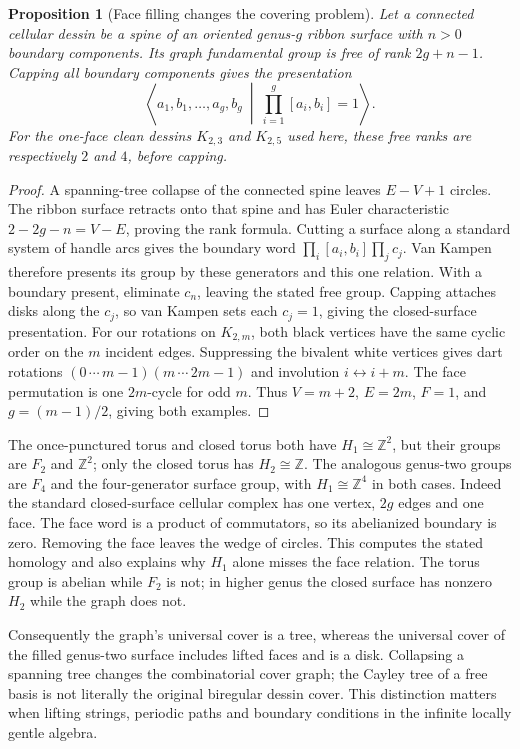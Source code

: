 \documentclass[11pt]{article}
\newtheorem{proposition}[theorem]{Proposition}
\theoremstyle{definition}\newtheorem{definition}[theorem]{Definition}
\theoremstyle{remark}\newtheorem{remark}[theorem]{Remark}
\begin{document}
\begin{proposition}[Face filling changes the covering problem]
Let a connected cellular dessin be a spine of an oriented genus-$g$ ribbon
surface with $n>0$ boundary components. Its graph fundamental group is free
of rank $2g+n-1$. Capping all boundary components gives the presentation
\[
 \left\langle a_1,b_1,\ldots,a_g,b_g\ \middle|\
       \prod_{i=1}^g[a_i,b_i]=1\right\rangle.
\]
For the one-face clean dessins $K_{2,3}$ and $K_{2,5}$ used here, these free
ranks are respectively $2$ and $4$, before capping.
\end{proposition}
\begin{proof}
A spanning-tree collapse of the connected spine leaves $E-V+1$ circles.
The ribbon surface retracts onto that spine and has Euler characteristic
$2-2g-n=V-E$, proving the rank formula. Cutting a surface along a standard
system of handle arcs gives the boundary word
$\prod_i[a_i,b_i]\prod_jc_j$. Van Kampen therefore presents its group by
these generators and this one relation. With a boundary present, eliminate
$c_n$, leaving the stated free group. Capping attaches disks along the $c_j$,
so van Kampen sets each $c_j=1$, giving the closed-surface presentation.
For our rotations on $K_{2,m}$, both black vertices have the same cyclic
order on the $m$ incident edges. Suppressing the bivalent white vertices
gives dart rotations $(0\,\cdots\,m-1)(m\,\cdots\,2m-1)$ and involution
$i\leftrightarrow i+m$. The face permutation is one $2m$-cycle for odd $m$.
Thus $V=m+2$, $E=2m$, $F=1$, and $g=(m-1)/2$, giving both examples.
\end{proof}

The once-punctured torus and closed torus both have $H_1\cong\mathbb Z^2$,
but their groups are $F_2$ and $\mathbb Z^2$; only the closed torus has
$H_2\cong\mathbb Z$. The analogous genus-two groups are $F_4$ and the
four-generator surface group, with $H_1\cong\mathbb Z^4$ in both cases.
Indeed the standard closed-surface cellular complex has one vertex,
$2g$ edges and one face. The face word is a product of commutators, so its
abelianized boundary is zero. Removing the face leaves the wedge of circles.
This computes the stated homology and also explains why $H_1$ alone misses
the face relation. The torus group is abelian while $F_2$ is not; in higher
genus the closed surface has nonzero $H_2$ while the graph does not.

Consequently the graph's universal cover is a tree, whereas the universal
cover of the filled genus-two surface includes lifted faces and is a disk.
Collapsing a spanning tree changes the combinatorial cover graph; the Cayley
tree of a free basis is not literally the original biregular dessin cover.
This distinction matters when lifting strings, periodic paths and boundary
conditions in the infinite locally gentle algebra.
\end{document}
